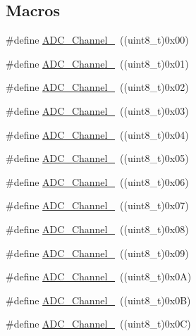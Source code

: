 \subsection*{Macros}
\begin{DoxyCompactItemize}
\item 
\#define \hyperlink{group___a_d_c__channels_ga40ec353803e9470a5721ef5bf0b1ab24}{A\+D\+C\+\_\+\+Channel\+\_}~((uint8\+\_\+t)0x00)
\item 
\#define \hyperlink{group___a_d_c__channels_ga0b04cebf8d62085eca6dc7daa3d5d3f0}{A\+D\+C\+\_\+\+Channel\+\_}~((uint8\+\_\+t)0x01)
\item 
\#define \hyperlink{group___a_d_c__channels_gabc66e2529583e11b591efd2df7070571}{A\+D\+C\+\_\+\+Channel\+\_}~((uint8\+\_\+t)0x02)
\item 
\#define \hyperlink{group___a_d_c__channels_ga9f93cbacd030f1c79f96f8889b0cdee6}{A\+D\+C\+\_\+\+Channel\+\_}~((uint8\+\_\+t)0x03)
\item 
\#define \hyperlink{group___a_d_c__channels_gafc7218417f729659dd8f06185cc2eafa}{A\+D\+C\+\_\+\+Channel\+\_}~((uint8\+\_\+t)0x04)
\item 
\#define \hyperlink{group___a_d_c__channels_ga42822abae41faabde2a2da877e0cc854}{A\+D\+C\+\_\+\+Channel\+\_}~((uint8\+\_\+t)0x05)
\item 
\#define \hyperlink{group___a_d_c__channels_ga7e24a73eec4aeb7d8e2f9008825ceacb}{A\+D\+C\+\_\+\+Channel\+\_}~((uint8\+\_\+t)0x06)
\item 
\#define \hyperlink{group___a_d_c__channels_ga9723aa5fe6b9f4af1ffd3b90e6eef8d1}{A\+D\+C\+\_\+\+Channel\+\_}~((uint8\+\_\+t)0x07)
\item 
\#define \hyperlink{group___a_d_c__channels_ga99b2c662d4068152e0e80a048036cc48}{A\+D\+C\+\_\+\+Channel\+\_}~((uint8\+\_\+t)0x08)
\item 
\#define \hyperlink{group___a_d_c__channels_ga01a61c428be0cb69327e428e32a42aa1}{A\+D\+C\+\_\+\+Channel\+\_}~((uint8\+\_\+t)0x09)
\item 
\#define \hyperlink{group___a_d_c__channels_gabfa98b580f49a82a83dcb1df32efceca}{A\+D\+C\+\_\+\+Channel\+\_}~((uint8\+\_\+t)0x0\+A)
\item 
\#define \hyperlink{group___a_d_c__channels_ga5bfc40d938f384f22665f6e2dd945cfd}{A\+D\+C\+\_\+\+Channel\+\_}~((uint8\+\_\+t)0x0\+B)
\item 
\#define \hyperlink{group___a_d_c__channels_gaa1e35f7870ae8f05013a681293175299}{A\+D\+C\+\_\+\+Channel\+\_}~((uint8\+\_\+t)0x0\+C)
\item 

\end{DoxyCompactItemize}
